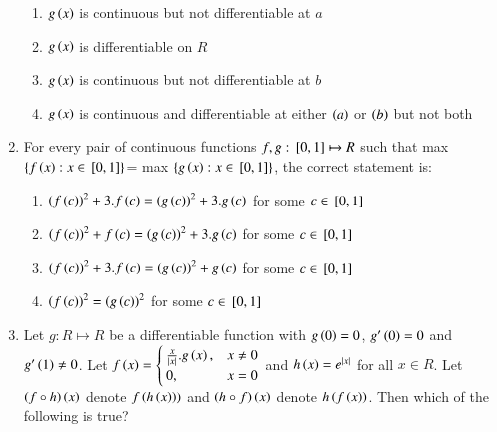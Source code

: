 \documentclass[journal,12pt]{IEEEtran}
\theoremstyle{remark}
\begin{document}
\begin{enumerate}
    \hfill 
    {}
    
    \begin{enumerate}
        
        \item $g\left(x\right)$ is continuous but not differentiable at $a$
        \item $g\left(x\right)$ is differentiable on $R$
        \item $g\left(x\right)$ is continuous but not differentiable at $b$
        \item $g\left(x\right)$ is continuous and differentiable at either $\left(a\right)$ or $\left(b\right)$ but not both 
    \end{enumerate}


    \item 
    For every pair of continuous functions $f, g: {}\left[0, 1\right]\mapsto R$ such that max $\left\{f\left(x\right): x\in {}\left[0, 1\right]\right\}$= max $\left\{g\left(x\right): x\in {}\left[0, 1\right]\right\}$, the correct statement is:
   
    \hfill 
    {}
    
    \begin{enumerate}

        \item ${\left(f\left(c\right)\right)}^2+3.f\left(c\right)={\left(g\left(c\right)\right)}^2+3.g\left(c\right)$ for some $c\in {}\left[0,1\right]$
        \item ${\left(f\left(c\right)\right)}^2+f\left(c\right)={\left(g\left(c\right)\right)}^2+3.g\left(c\right)$ for some $c\in {}\left[0,1\right]$
        \item ${\left(f\left(c\right)\right)}^2+3.f\left(c\right)={\left(g\left(c\right)\right)}^2+g\left(c\right)$ for some $c\in {}\left[0,1\right]$
        \item ${\left(f\left(c\right)\right)}^2={\left(g\left(c\right)\right)}^2$ for some $c\in {}\left[0,1\right]$ 
    \end{enumerate}


    \item 
	    Let $g: R\mapsto R$ be a differentiable function with $g\left(0\right)=0$, $g^{\prime}\left(0\right)=0$ and $g^{\prime}\left(1\right)\neq 0$. Let $f\left(x\right)=
        \begin{cases}
		\frac{x}{\left\vert x\right\vert}.g\left(x\right), & x\neq 0 \\
            0, & x=0
        \end{cases}$ 
        and $h\left(x\right)=e^{\left\vert x\right\vert}$ for all $x\in R$. Let $\left(f\circ h\right)\left(x\right)$ denote $f\left(h\left(x\right)\right))$ and $\left(h\circ f\right)\left(x\right)$ denote $h\left(f\left(x\right)\right)$. Then which of the following is true?
        

\end{enumerate}
\end{document}
